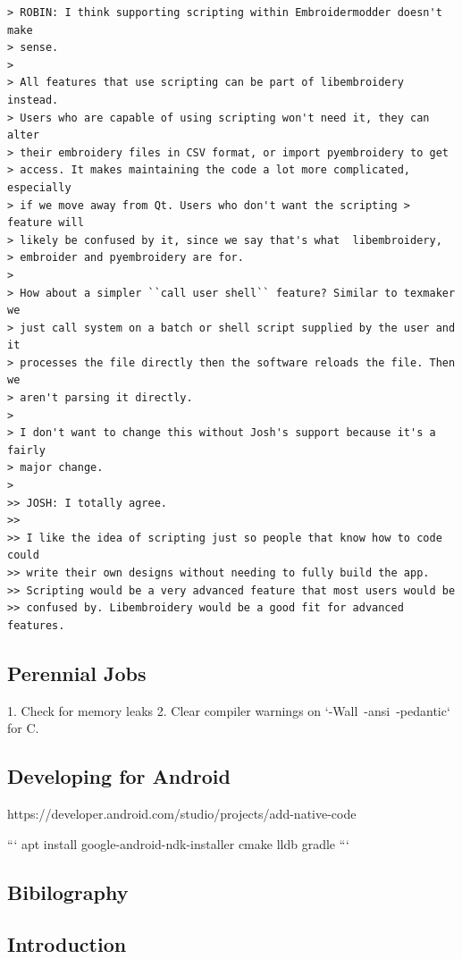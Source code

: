 \documentclass[10pt]{report}
\begin{document}
\begin{verbatim}
> ROBIN: I think supporting scripting within Embroidermodder doesn't make
> sense.
>
> All features that use scripting can be part of libembroidery instead.
> Users who are capable of using scripting won't need it, they can alter
> their embroidery files in CSV format, or import pyembroidery to get
> access. It makes maintaining the code a lot more complicated, especially
> if we move away from Qt. Users who don't want the scripting > feature will
> likely be confused by it, since we say that's what  libembroidery,
> embroider and pyembroidery are for.
>
> How about a simpler ``call user shell`` feature? Similar to texmaker we
> just call system on a batch or shell script supplied by the user and it
> processes the file directly then the software reloads the file. Then we
> aren't parsing it directly.
>
> I don't want to change this without Josh's support because it's a fairly
> major change.
>
>> JOSH: I totally agree.
>>
>> I like the idea of scripting just so people that know how to code could
>> write their own designs without needing to fully build the app.
>> Scripting would be a very advanced feature that most users would be
>> confused by. Libembroidery would be a good fit for advanced features.
\end{verbatim}

\subsection{Perennial Jobs}

1. Check for memory leaks
2. Clear compiler warnings on `-Wall\ -ansi\ -pedantic` for C.

\subsection{Developing for Android}

https://developer.android.com/studio/projects/add-native-code

```
apt install google-android-ndk-installer cmake lldb gradle
```

\subsection{Bibilography}

\subsection{Introduction}
\end{document}
